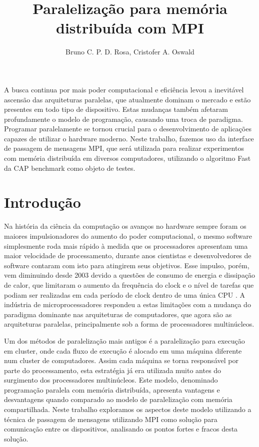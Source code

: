 \documentclass[12pt]{article}
\title{Paralelização para memória distribuída com MPI}
\author{Bruno C. P. D. Rosa, Cristofer A. Oswald}
\begin{document}
 

\maketitle
     
\begin{resumo} 
  A busca continua por mais poder computacional e eficiência levou a inevitável ascensão das arquiteturas paralelas, que atualmente dominam o mercado e estão presentes em todo tipo de dispositivo. Estas mudanças também afetaram profundamente o modelo de programação, causando uma troca de paradigma. Programar paralelamente se tornou crucial para o desenvolvimento de aplicações capazes de utilizar o hardware moderno. Neste trabalho, fazemos uso da interface de passagem de mensagens MPI, que será utilizada para realizar experimentos com memória distribuída em diversos computadores, utilizando o algoritmo Fast da CAP benchmark como objeto de testes.
\end{resumo}


\section{Introdução}
Na história da ciência da computação os avanços no hardware sempre foram os maiores impulsionadores do aumento do poder computacional, o mesmo software simplesmente roda mais rápido à medida que os processadores apresentam uma maior velocidade de processamento, durante anos cientistas e desenvolvedores de software contaram com isto para atingirem seus objetivos. Esse impulso, porém, vem diminuindo desde 2003 devido a questões de consumo de energia e dissipação de calor, que limitaram o aumento da frequência do clock e o nível de tarefas que podiam ser realizadas em cada período de clock dentro de uma única CPU \cite{kirk2011programming}. A indústria de microprocessadores respondeu a estas limitações com a mudança do paradigma dominante nas arquiteturas de computadores, que agora são as arquiteturas paralelas, principalmente sob a forma de processadores multinúcleos.

Um dos métodos de paralelização mais antigos é a paralelização para execução em cluster, onde cada fluxo de execução é alocado em uma máquina diferente num cluster de computadores. Assim cada máquina se torna responsável por parte do processamento, esta estratégia já era utilizada muito antes do surgimento dos processadores multinúcleos. Este modelo, denominado programação paralela com memória distribuída, apresenta vantagens e desvantagens quando comparado ao modelo de paralelização com memória compartilhada. Neste trabalho exploramos os aspectos deste modelo utilizando a técnica de passagem de mensagens utilizando MPI como solução para comunicação entre os dispositivos, analisando os pontos fortes e fracos desta solução.
\end{document}
